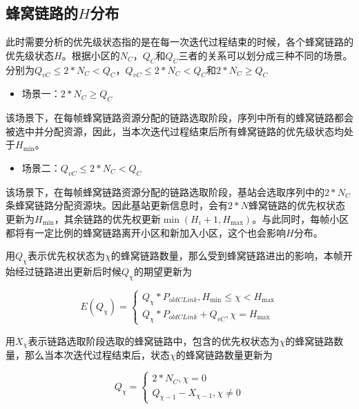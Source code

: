 \documentclass[figurelist,tablelist,algorithmlist,nomlist,masters]{seuthesix}
\begin{document}
	\subsection{蜂窝链路的${H}$分布}
	此时需要分析的优先级状态指的是在每一次迭代过程结束的时候，各个蜂窝链路的优先级状态${H}$。根据小区的$N_C$，$Q_C$和$Q_C$三者的关系可以划分成三种不同的场景。分别为$Q_{vC} \le 2*N_C < Q_C$，$Q_{vC} \le 2*N_C < Q_C$和$2*N_C \ge Q_C$
	
	\begin{itemize}
		\item 场景一：$2*N_C \ge Q_C$
	\end{itemize}
	
	该场景下，在每帧蜂窝链路资源分配的链路选取阶段，序列中所有的蜂窝链路都会被选中并分配资源，因此，当本次迭代过程结束后所有蜂窝链路的优先级状态均处于${H_{\min }}$。
	
	\begin{itemize}
		\item 场景二：$Q_{vC} \le 2*N_C < Q_C$
	\end{itemize}
	
	该场景下，在每帧蜂窝链路资源分配的链路选取阶段，基站会选取序列中的$2*N_C$条蜂窝链路分配资源块。因此基站更新信息时，会有$2*N$蜂窝链路的优先权状态更新为${H_{\min }}$，其余链路的优先权更新$\min ({H_i} + 1,{H_{\max }})$。与此同时，每帧小区都将有一定比例的蜂窝链路离开小区和新加入小区，这个也会影响${H}$分布。
	
	
	用$Q_{\chi }$表示优先权状态为$\chi $的蜂窝链路数量，那么受到蜂窝链路进出的影响，本帧开始经过链路进出更新后时候$Q_{\chi }$的期望更新为
	
	\begin{equation}\label{eq3.1}
	E(Q_{\chi }) = \left\{ \begin{array}{l}
	Q_{\chi }*{P_{oldCLink}},{H_{\min }} \le \chi  < {H_{\max }}\\
	Q_{\chi }*{P_{oldCLink}} + Q_{vC},{\chi } = {H_{\max }}
	\end{array} \right.
	\end{equation}
	
	用$X_{\chi }$表示链路选取阶段选取的蜂窝链路中，包含的优先权状态为$\chi $的蜂窝链路数量，那么当本次迭代过程结束后，状态$\chi $的蜂窝链路数量更新为
	
	\begin{equation}\label{eq3.1}
	Q_\chi  = \left\{ \begin{array}{l}
	2*N_C,\chi  = 0\\
	Q_{\chi  - 1} - X_{\chi - 1},\chi \ne 0
	\end{array} \right.
	\end{equation}
	
\end{document}
